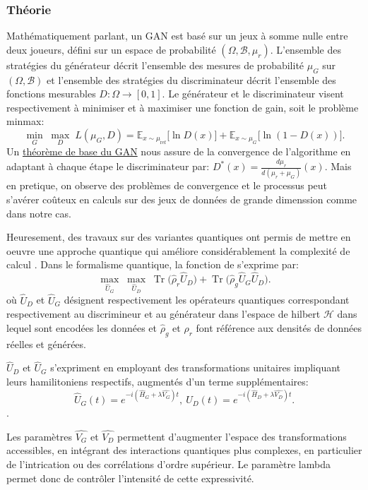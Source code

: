 \documentclass[a4paper]{article}
\begin{document}
\subsubsection{Théorie}

Mathématiquement parlant, un GAN est basé sur un jeux à somme nulle entre deux joueurs, défini sur un espace de probabilité $ ( \Omega, \mathcal{B}, \mu_{r})$. L'ensemble des stratégies du générateur décrit l'ensemble des mesures de probabilité $ \mu_{G}$ sur $ ( \Omega, \mathcal{B})$ et l'ensemble des stratégies du discriminateur décrit l'ensemble des fonctions mesurables $D : \Omega \rightarrow [0,1]$. Le générateur et le discriminateur visent respectivement à minimiser et à maximiser une fonction de gain, soit le problème minmax: 
$$ \underset{G}{\min}\;\underset{D}{\max}\; L(\mu_{G},D)=
\mathbb{E}_{x \sim \mu_{\mathrm{ref}}}\bigl[\ln D(x)\bigr]
+
\mathbb{E}_{x \sim \mu_G}\bigl[\ln(1 - D(x))\bigr].$$
Un \href{https://fr.wikipedia.org/wiki/R%C3%A9seaux_antagonistes_g%C3%A9n%C3%A9ratifs}{théorème de base du GAN} nous assure de la convergence de l'algorithme en adaptant à chaque étape le discriminateur par: 
$D^*(x) = \frac{d\mu_r}{d(\mu_r + \mu_G)}(x)$. Mais en pretique, on observe des problèmes de convergence et le processus peut s'avérer coûteux en calculs sur des jeux de données de grande dimenssion comme dans notre cas.

Heuresement, des travaux sur des variantes quantiques ont permis de mettre en oeuvre une approche quantique qui améliore considérablement la complexité de calcul \cite{QGANs}. Dans le formalisme quantique, la fonction de s'exprime par:
 \[
\max_{\hat{U}_G} \; \max_{\hat{U}_D} \;
\operatorname{Tr}\!\big(\hat{\rho}_r \hat{U}_D\big)
+
\operatorname{Tr}\!\big(\hat{\rho}_g \hat{U}_G \hat{U}_D\big).
\]
où $\hat{U}_D$ et $\hat{U}_G$ désignent respectivement les opérateurs quantiques correspondant respectivement au discrimineur et au générateur dans l'espace de hilbert $\mathcal{H}$ dans lequel sont encodées les données et $\hat{\rho}_g$ et $\hat{\rho}_r$ font référence aux densités de données réelles et générées.

$\hat{U}_D$ et $\hat{U}_G$ s'expriment en employant des transformations unitaires impliquant leurs hamilitoniens respectifs, augmentés d'un terme supplémentaires: 
\[
\hat{U}_G(t) = e^{-i(\hat{H}_G +\lambda \hat{V_G})t} ,~
\hat{U}_D(t) = e^{-i(\hat{H}_D+\lambda \hat{V_D})t}.
\].

Les paramètres $\hat{V_G}$ et $\hat{V_D}$ permettent d’augmenter l’espace des transformations accessibles, en intégrant des interactions quantiques plus complexes, en particulier de l’intrication ou des corrélations d’ordre supérieur. Le paramètre lambda permet donc de contrôler l'intensité de cette expressivité. 
\end{document}
